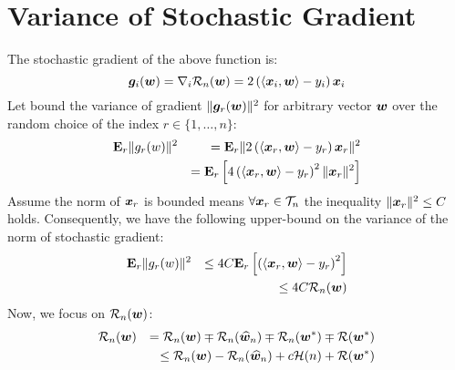 \documentclass{article}
\begin{document}
\section{Variance of Stochastic Gradient}
The stochastic gradient of the above function is: 
\begin{equation*}
	\bm{g}_i(\bm{w}) = \nabla_{i}  {\cal R}_n (\bm{w}) = 2\left(\langle \bm{x}_i, \bm{w}\rangle -
	y_i\right) \bm{x}_i
\end{equation*} 
Let bound the variance
of gradient $\|\bm{g}_r(\bm{w})\|^2$ for arbitrary vector $\bm{w}$ over the random choice
of the index $r \in \{ 1, \ldots, n \}$:
\begin{eqnarray*}
	& \mathbf{E}_r \| g_r(w) \|^2 & = \mathbf{E}_r \|2\left(\langle \bm{x}_r, \bm{w}\rangle -
	y_r\right) \bm{x}_r \|^2 \\ 
	& & = \mathbf{E}_r \left[4\left(\langle \bm{x}_r, \bm{w}\rangle -
	y_r\right)^2 \|\bm{x}_r\|^2\right]
\end{eqnarray*}
Assume the norm of $\bm{x}_r$ is bounded means $\forall \bm{x}_r \in {\cal T}_n$ the
inequality $\|\bm{x}_r\|^2 \leq C$ holds. Consequently, we have the following
upper-bound on the variance of the norm of stochastic gradient: 
\begin{eqnarray}
	& \mathbf{E}_r \| g_r(w) \|^2  & \leq 4 C \mathbf{E}_r \left[\left(\langle \bm{x}_r, \bm{w}\rangle -
	y_r\right)^2 \right] \nonumber \\
	& & \leq 4 C {\cal R}_n(\bm{w}) \label{eq:variance_bound}
\end{eqnarray}
Now, we focus on ${\cal R}_n(\bm{w})$: 
\begin{eqnarray}
& {\cal R}_n(\bm{w}) & = {\cal R}_n(\bm{w}) \mp {\cal R}_n(\widehat{\bm{w}}_n) \mp {\cal R}_n(\bm{w}^*) \mp
{\cal R}(\bm{w}^*)
\nonumber
\\
& & \leq {\cal R}_n(\bm{w}) - {\cal R}_n(\widehat{\bm{w}}_n) +c {\cal H}(n) + {\cal R}(\bm{w}^*)
\label{eq:risk_bound}
\end{eqnarray}
\end{document}
